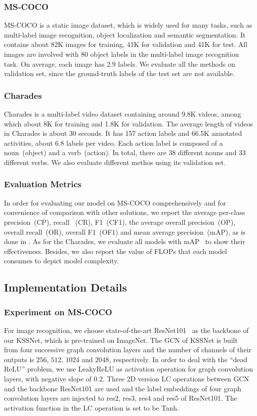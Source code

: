 \documentclass[letterpaper]{article} \usepackage{aaai20}  \usepackage{times}  \usepackage{helvet} \usepackage{courier}  \usepackage[hyphens]{url}  \usepackage{graphicx} \usepackage{subfigure}
\begin{document}
\subsubsection{MS-COCO}
MS-COCO \cite{Lin2014Microsoft} is a static image dataset, which is widely used for many tasks, such as multi-label image recognition, object localization and semantic segmentation. It contains about 82K images for training, 41K for validation and 41K for test. All images are involved with 80 object labels in the multi-label image recognition task. On average, each image has 2.9 labels. We evaluate all the methods on validation set, since the ground-truth labels of the test set are not available. 

\subsubsection{Charades}
Charades \cite{Sigurdsson2016Hollywood} is a multi-label video dataset containing around 9.8K videos, among which about 8K for training and 1.8K for validation. The average length of videos in Charades is about 30 seconds. It has 157 action labels and 66.5K annotated activities, about 6.8 labels per video. Each action label is composed of a noun~(object) and a verb~(action). In total, there are 38 different nouns and 33 different verbs. We also evaluate different methos using its validation set.


\subsubsection{Evaluation Metrics}
In order for evaluating our model on MS-COCO comprehensively and for convenience of comparison with other solutions, we report the average per-class precision~(CP), recall~ (CR), F1~(CF1), the average overall precision~(OP), overall recall~(OR), overall F1~(OF1) and mean average precision~(mAP), as is done in \cite{chen2019multi}. As for the Charades, we evaluate all models with mAP~\cite{Sigurdsson2016Hollywood} to show their effectiveness. Besides, we also report the value of FLOPs that each model consumes to depict model complexity.


\subsection{Implementation Details}
\subsubsection{Experiment on MS-COCO}
For image recognition, we choose state-of-the-art ResNet101~\cite{he2016deep} as the backbone of our KSSNet, which is pre-trained on ImageNet. The GCN of KSSNet is built from four successive graph convolution layers and the number of channels of their outputs is $256$, $512$, $1024$ and $2048$, respectively. In order to deal with the ``dead ReLU'' problem, we use LeakyReLU as activation operation for graph convolution layers, with negative slope of $0.2$. Three 2D version LC operations between GCN and the backbone ResNet101 are used and the label embeddings of four graph convolution layers are injected to res2, res3, res4 and res5 of ResNet101. The activation function in the LC operation is set to be Tanh.
\end{document}
